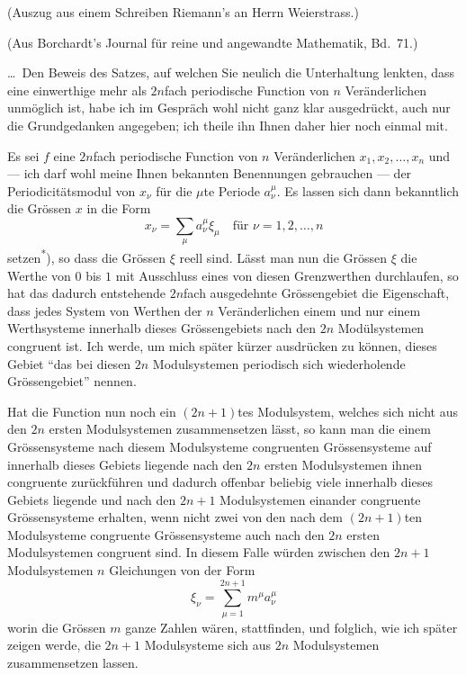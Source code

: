 \documentclass[12pt,a4paper]{article}
\begin{document}
\noindent\small{(Auszug aus einem Schreiben Riemann's an Herrn Weierstrass.)}

\noindent\small{(Aus Borchardt's Journal f\"ur reine und angewandte Mathematik, Bd.~71.)}

\medskip

\normalsize
\dots\ Den Beweis des Satzes, auf welchen Sie neulich die Unterhaltung lenkten, dass eine einwerthige mehr als $2n$fach periodische Function von $n$ Ver\"anderlichen unm\"oglich ist, habe ich im Gespr\"ach wohl nicht ganz klar ausgedr\"uckt, auch nur die Grundgedanken angegeben; ich theile ihn Ihnen daher hier noch einmal mit.

Es sei $f$ eine $2n$fach periodische Function von $n$ Ver\"anderlichen $x_{1}, x_{2}, \dots, x_{n}$ und --- ich darf wohl meine Ihnen bekannten Benennungen gebrauchen --- der Periodicit\"atsmodul von $x_{\nu}$ f\"ur die $\mu$te Periode $a^{\mu}_{\nu}$. Es lassen sich dann bekanntlich die Gr\"ossen $x$ in die Form
\[x_{\nu} = \sum_{\mu} a^{\mu}_{\nu} \xi_{\mu} \quad \text{f\"ur } \nu = 1, 2, \dots, n\]
setzen\textsuperscript{*}), so dass die Gr\"ossen $\xi$ reell sind. L\"asst man nun die Gr\"ossen $\xi$ die Werthe von $0$ bis $1$ mit Ausschluss eines von diesen Grenzwerthen durchlaufen, so hat das dadurch entstehende $2n$fach ausgedehnte Gr\"ossengebiet die Eigenschaft, dass jedes System von Werthen der $n$ Ver\"anderlichen einem und nur einem Werthsysteme innerhalb dieses Gr\"ossengebiets nach den $2n$ Mod\"ulsystemen congruent ist. Ich werde, um mich sp\"ater k\"urzer ausdr\"ucken zu k\"onnen, dieses Gebiet ``das bei diesen $2n$ Modulsystemen periodisch sich wiederholende Gr\"ossengebiet'' nennen.

Hat die Function nun noch ein $(2n+1)$tes Modulsystem, welches sich nicht aus den $2n$ ersten Modulsystemen zusammensetzen l\"asst, so kann man die einem Gr\"ossensysteme nach diesem Modulsysteme congruenten Gr\"ossensysteme auf innerhalb dieses Gebiets liegende nach den $2n$ ersten Modulsystemen ihnen congruente zur\"uckf\"uhren und dadurch offenbar beliebig viele innerhalb dieses Gebiets liegende und nach den $2n+1$ Modulsystemen einander congruente Gr\"ossensysteme erhalten, wenn nicht zwei von den nach dem $(2n+1)$ten Modulsysteme congruente Gr\"ossensysteme auch nach den $2n$ ersten Modulsystemen congruent sind. In diesem Falle w\"urden zwischen den $2n+1$ Modulsystemen $n$ Gleichungen von der Form
\[\xi_{\nu} = \sum_{\mu=1}^{2n+1} m^{\mu} a^{\mu}_{\nu}\]
worin die Gr\"ossen $m$ ganze Zahlen w\"aren, stattfinden, und folglich, wie ich sp\"ater zeigen werde, die $2n+1$ Modulsysteme sich aus $2n$ Modulsystemen zusammensetzen lassen.
\end{document}
